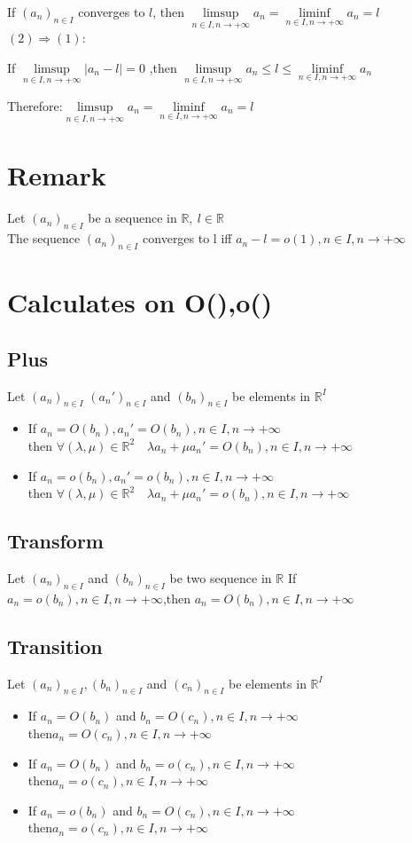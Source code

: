 \documentclass{book}
\begin{document}
If $(a_n)_{n\in I }$ converges to $l$, then $\limsup\limits_{n\in I,n\rightarrow+\infty}a_n=\liminf\limits_{n\in I,n\rightarrow+\infty}a_n=l$\\
$(2)\Rightarrow(1)$:

If $\limsup\limits_{n\in I,n\rightarrow+\infty}\lvert a_n-l\rvert=0$ ,then $\limsup\limits_{n\in I,n\rightarrow+\infty}a_n\leq l\leq\liminf\limits_{n\in I,n\rightarrow+\infty}a_n$

Therefore:$\limsup\limits_{n\in I,n\rightarrow+\infty}a_n=\liminf\limits_{n\in I,n\rightarrow+\infty}a_n=l$
\section{Remark}
Let $(a_n)_{n\in I }$ be a sequence in $\mathbb{R} ,\ l\in \mathbb{R} $ \\\indent The sequence $(a_n)_{n\in I }$ converges to l iff $a_n-l=o(1),n\in I,n\rightarrow+\infty$
\section{Calculates on O(),o()}
\subsection{Plus}
Let  $(a_n)_{n\in I }$ $(a_n')_{n\in I }$ and  $(b_n)_{n\in I }$ be elements in $\mathbb{R} ^I$
\begin{itemize}
    \item If $a_n=O(b_n),a_n'=O(b_n),n\in I,n\rightarrow+\infty$\\then $\forall(\lambda,\mu)\in\mathbb{R} ^2\quad\lambda a_n+\mu a_n'=O(b_n),n\in I,n\rightarrow+\infty$
    \item If $a_n=o(b_n),a_n'=o(b_n),n\in I,n\rightarrow+\infty$\\then $\forall(\lambda,\mu)\in\mathbb{R} ^2\quad\lambda a_n+\mu a_n'=o(b_n),n\in I,n\rightarrow+\infty$
\end{itemize}
\subsection{Transform}
Let $(a_n)_{n\in I }$ and $(b_n)_{n\in I }$ be two sequence in $\mathbb{R} $ If $a_n=o(b_n),n\in I,n\rightarrow+\infty$,then $a_n=O(b_n),n\in I,n\rightarrow+\infty$
\subsection{Transition}
Let $(a_n)_{n\in I},(b_n)_{n\in I}$ and $(c_n)_{n\in I}$  be elements in $\mathbb{R} ^I$
\begin{itemize}
    \item If $a_n=O(b_n)$ and $ b_n=O(c_n),n\in I,n\rightarrow+\infty$\\then$a_n=O(c_n),n\in I,n\rightarrow+\infty$
    \item If $a_n=O(b_n)$ and $ b_n=o(c_n),n\in I,n\rightarrow+\infty$\\then$a_n=o(c_n),n\in I,n\rightarrow+\infty$
    \item If $a_n=o(b_n)$ and $ b_n=O(c_n),n\in I,n\rightarrow+\infty$\\then$a_n=o(c_n),n\in I,n\rightarrow+\infty$
\end{itemize} 
\end{document}
